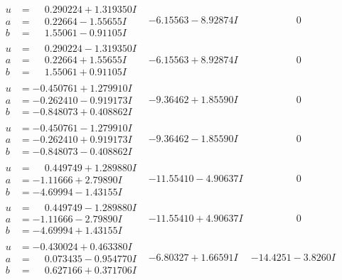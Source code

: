 \documentclass[1p]{elsarticle_modified}
\theoremstyle{definition}
\begin{document}
$$\begin{array}{c|c|c}
\begin{aligned}
u &= \phantom{-}0.290224 + 1.319350 I \\
a &= \phantom{-}0.22664 - 1.55655 I \\
b &= \phantom{-}1.55061 - 0.91105 I\end{aligned}
 & -6.15563 - 8.92874 I & \phantom{-0.000000 } 0 \\ \hline\begin{aligned}
u &= \phantom{-}0.290224 - 1.319350 I \\
a &= \phantom{-}0.22664 + 1.55655 I \\
b &= \phantom{-}1.55061 + 0.91105 I\end{aligned}
 & -6.15563 + 8.92874 I & \phantom{-0.000000 } 0 \\ \hline\begin{aligned}
u &= -0.450761 + 1.279910 I \\
a &= -0.262410 - 0.919173 I \\
b &= -0.848073 + 0.408862 I\end{aligned}
 & -9.36462 + 1.85590 I & \phantom{-0.000000 } 0 \\ \hline\begin{aligned}
u &= -0.450761 - 1.279910 I \\
a &= -0.262410 + 0.919173 I \\
b &= -0.848073 - 0.408862 I\end{aligned}
 & -9.36462 - 1.85590 I & \phantom{-0.000000 } 0 \\ \hline\begin{aligned}
u &= \phantom{-}0.449749 + 1.289880 I \\
a &= -1.11666 + 2.79890 I \\
b &= -4.69994 - 1.43155 I\end{aligned}
 & -11.55410 - 4.90637 I & \phantom{-0.000000 } 0 \\ \hline\begin{aligned}
u &= \phantom{-}0.449749 - 1.289880 I \\
a &= -1.11666 - 2.79890 I \\
b &= -4.69994 + 1.43155 I\end{aligned}
 & -11.55410 + 4.90637 I & \phantom{-0.000000 } 0 \\ \hline\begin{aligned}
u &= -0.430024 + 0.463380 I \\
a &= \phantom{-}0.073435 - 0.954770 I \\
b &= \phantom{-}0.627166 + 0.371706 I\end{aligned}
 & -6.80327 + 1.66591 I & -14.4251 - 3.8260 I \\ \hline\begin{aligned}

\end{aligned}
\end{array}$$
\end{document}
